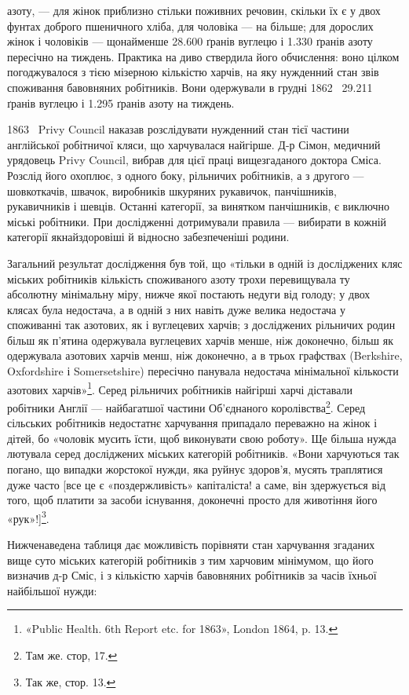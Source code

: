 \parcont{}  %
азоту, — для жінок приблизно стільки поживних речовин,
скільки їх є у двох фунтах доброго пшеничного хліба, для чоловіка — на
 більше; для дорослих жінок і чоловіків — щонайменше
\num{28.600} ґранів вуглецю і \num{1.330} ґранів азоту пересічно на тиждень.
Практика на диво ствердила його обчислення: воно цілком погоджувалося
з тією мізерною кількістю харчів, на яку нужденний
стан звів споживання бавовняних робітників. Вони одержували
в грудні 1862~ \num{29.211} ґранів вуглецю і \num{1.295} ґранів азоту
на тиждень.

1863~ Privy Council наказав розслідувати нужденний стан
тієї частини англійської робітничої кляси, що харчувалася найгірше.
Д-р Сімон, медичний урядовець Privy Council, вибрав
для цієї праці вищезгаданого доктора Сміса. Розслід його охоплює,
з одного боку, рільничих робітників, а з другого — шовкоткачів,
швачок, виробників шкуряних рукавичок, панчішників,
рукавичників і шевців. Останні категорії, за винятком панчішників,
є виключно міські робітники. При дослідженні дотримували
правила — вибирати в кожній категорії якнайздоровіші
й відносно забезпеченіші родини.

Загальний результат дослідження був той, що «тільки в
одній із досліджених кляс міських робітників кількість споживаного
азоту трохи перевищувала ту абсолютну мінімальну
міру, нижче якої постають недуги від голоду; у двох клясах
була недостача, а в одній з них навіть дуже велика недостача
у споживанні так азотових, як і вуглецевих харчів; з досліджених
рільничих родин більш як п’ятина одержувала вуглецевих
харчів менше, ніж доконечно, більш як  одержувала
азотових харчів менш, ніж доконечно, а в трьох графствах
(Berkshire, Oxfordshire і Somersetshire) пересічно панувала недостача
мінімальної кількости азотових харчів»\footnote{
«Public Health. 6th Report etc. for 1863», London 1864, p. 13.
}. Серед рільничих
робітників найгірші харчі діставали робітники Англії —
найбагатшої частини Об’єднаного королівства\footnote{
Там же. стор, 17.
}. Серед сільських
робітників недостатнє харчування припадало переважно
на жінок і дітей, бо «чоловік мусить їсти, щоб виконувати свою
роботу». Ще більша нужда лютувала серед досліджених міських
категорій робітників. «Вони харчуються так погано, що випадки
жорстокої нужди, яка руйнує здоров’я, мусять траплятися дуже
часто [все це є «поздержливість» капіталіста! а саме, він здержується
від того, щоб платити за засоби існування, доконечні
просто для животіння його «рук»!]\footnote{
Так же, стор. 13.
}.

Нижченаведена таблиця дає можливість порівняти стан харчування
згаданих вище суто міських категорій робітників з
тим харчовим мінімумом, що його визначив д-р Сміс, і з
кількістю харчів бавовняних робітників за часів їхньої найбільшої
нужди:
\parbreak{}  %
